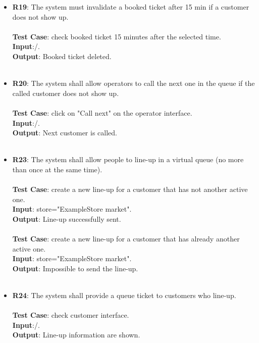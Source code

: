 \begin{itemize}
	\item \textbf{R19}: The system must invalidate a booked ticket after 15 min if a customer does not show up. \\ \\ \textbf{Test Case}: check booked ticket 15 minutes after the selected time.   \\ 
 \textbf{Input}:/.\\ 		\textbf{Output}: Booked ticket deleted. \\ \\


	\item \textbf{R20}: The system shall allow operators to call the next one in the queue if the called customer does not show up. \\ \\ \textbf{Test Case}: click on "Call next" on the operator interface.  \\ 
 \textbf{Input}:/.\\ 		\textbf{Output}: Next customer is called. \\ \\


	\item \textbf{R23}: The system shall allow people to line-up in a virtual queue (no more than once at the same time). \\ \\ \textbf{Test Case}: create a new line-up for a customer that has not another active one.  \\ 
 \textbf{Input}: store="ExampleStore market".\\ 		\textbf{Output}: Line-up successfully sent. 
 \\ \\ \textbf{Test Case}: create a new line-up for a customer that has already another active one.  \\ 
 \textbf{Input}: store="ExampleStore market".\\ 		\textbf{Output}: Impossible to send the line-up. \\ \\



	\item \textbf{R24}: The system shall provide a queue ticket to customers who line-up. \\ \\ \textbf{Test Case}: check customer interface.  \\ 
 \textbf{Input}:/.\\ 		\textbf{Output}: Line-up information are shown. \\ \\




\end{itemize}
